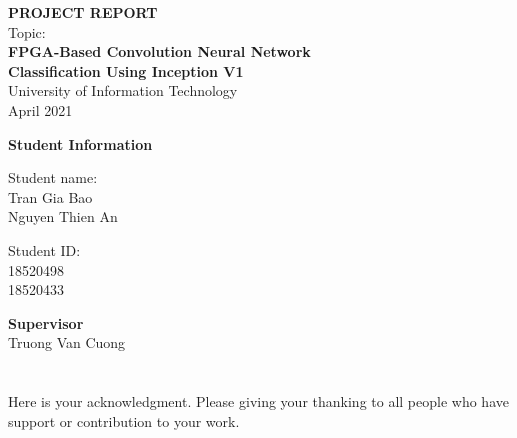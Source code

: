 \documentclass[12pt]{report}
\begin{document}
	
	\thispagestyle{empty}
	\begin{center}
		
		\vspace*{3cm}
		{\bf \LARGE PROJECT REPORT}\\
		\vspace*{2cm}
		Topic:\\
		{\bf \Large FPGA-Based Convolution Neural Network\\ Classification Using Inception V1 }\\
		\vspace{3cm}
		{\Large University of Information Technology}\\
		\vspace{5cm}
		{\Large April 2021}
	\end{center}
	
	\newpage
	\vspace*{5cm}
	\begin{center}
		{\bf \Large Student Information}\\
	\end{center}
	\begin{multicols}{2}
		\begin{center}
		Student name: \\
		Tran Gia Bao \\
		Nguyen Thien An \\
		\end{center}
	
		\begin{center}
		Student ID:\\
  		18520498\\
	    18520433\\
		\end{center}
	\end{multicols}
	\vspace{5cm}
	\begin{center}
	{\bf \Large Supervisor}\\
	Truong Van Cuong	
	\end{center}

	
	\newpage
	\section*{}
	Here is your acknowledgment.
	Please giving your thanking to all people who have support or contribution to your work.
	
\end{document}
